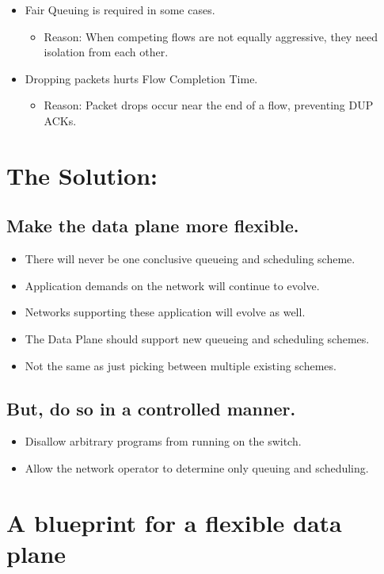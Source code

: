{\begin{multicols}{2}
\begin{itemize}
\item Fair Queuing is required in some cases.
      \begin{itemize}      
      \item Reason: When competing flows are not equally aggressive, they need isolation from each other.
      \end{itemize}

\item Dropping packets hurts Flow Completion Time.
      \begin{itemize}
      \item Reason: Packet drops occur near the end of a flow, preventing DUP ACKs.
      \end{itemize}

\end{itemize}

%
\section*{The Solution:}
\subsection*{Make the data plane more flexible.}
\begin{itemize}
\item There will never be one conclusive queueing and scheduling scheme.
\item Application demands on the network will continue to evolve.
\item Networks supporting these application will evolve as well.
\item The Data Plane should support new queueing and scheduling schemes.
\item Not the same as just picking between multiple existing schemes.
\end{itemize}

\subsection*{But, do so in a controlled manner.}
\begin{itemize}
\item Disallow arbitrary programs from running on the switch.
\item Allow the network operator to determine only queuing and scheduling.
\end{itemize}

\section*{A blueprint for a flexible data plane}


\end{multicols}}
